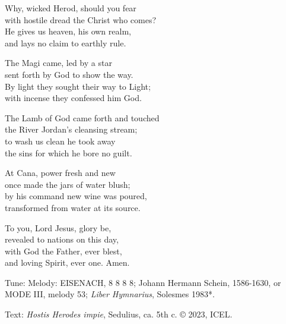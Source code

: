 \hymn

\settowidth{\versewidth}{with hostile dread the Christ who comes?}

\begin{hymnverse}%
Why, wicked Herod, should you fear\\
with hostile dread the Christ who comes?\\
He gives us heaven, his own realm,\\
and lays no claim to earthly rule.

The Magi came, led by a star\\
sent forth by God to show the way.\\
By light they sought their way to Light;\\
with incense they confessed him God.

The Lamb of God came forth and touched\\
the River Jordan’s cleansing stream;\\
to wash us clean he took away\\
the sins for which he bore no guilt.

At Cana, power fresh and new\\
once made the jars of water blush;\\
by his command new wine was poured,\\
transformed from water at its source.

To you, Lord Jesus, glory be,\\
revealed to nations on this day,\\
with God the Father, ever blest,\\
and loving Spirit, ever one. Amen.
\end{hymnverse}

\begin{hymnsource}
Tune: Melody: EISENACH, 8 8 8 8; Johann Hermann Schein, 1586-1630, or MODE III, melody 53; \emph{Liber Hymnarius}, Solesmes 1983*.

Text: \emph{Hostis Herodes impie}, Sedulius, ca. 5th c. © 2023, ICEL.
\end{hymnsource}